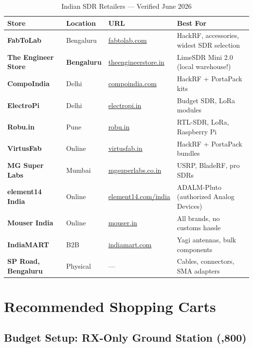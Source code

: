 \documentclass[12pt,a4paper]{article}
\begin{document}
\begin{table}[h!]
\centering
\caption{Indian SDR Retailers — Verified June 2026}
\begin{tabular}{@{}lllp{4cm}@{}}
\toprule
\textbf{Store} & \textbf{Location} & \textbf{URL} & \textbf{Best For} \\
\midrule
\textbf{FabToLab} & Bengaluru & \url{fabtolab.com} & HackRF, accessories, widest SDR selection \\
\textbf{The Engineer Store} & \textbf{Bengaluru} & \url{theengineerstore.in} & LimeSDR Mini 2.0 (local warehouse!) \\
\textbf{CompoIndia} & Delhi & \url{compoindia.com} & HackRF + PortaPack kits \\
\textbf{ElectroPi} & Delhi & \url{electropi.in} & Budget SDR, LoRa modules \\
\textbf{Robu.in} & Pune & \url{robu.in} & RTL-SDR, LoRa, Raspberry Pi \\
\textbf{VirtusFab} & Online & \url{virtusfab.in} & HackRF + PortaPack bundles \\
\textbf{MG Super Labs} & Mumbai & \url{mgsuperlabs.co.in} & USRP, BladeRF, pro SDRs \\
\textbf{element14 India} & Online & \url{element14.com/india} & ADALM-Pluto (authorized Analog Devices) \\
\textbf{Mouser India} & Online & \url{mouser.in} & All brands, no customs hassle \\
\textbf{IndiaMART} & B2B & \url{indiamart.com} & Yagi antennas, bulk components \\
\textbf{SP Road, Bengaluru} & Physical & --- & Cables, connectors, SMA adapters \\
\bottomrule
\end{tabular}
\end{table}

\section{Recommended Shopping Carts}

\subsection{Budget Setup: RX-Only Ground Station (,800)}
\end{document}
